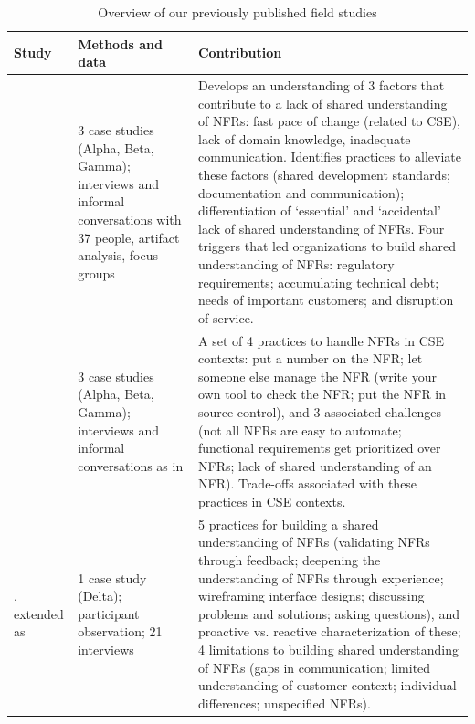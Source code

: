 \documentclass[smallextended]{svjour3}        %
\providecommand{\DIFdelbeginFL}{} %
\newcommand{\DIFscaledelfig}{0.5}
\newlength{\DIFdelgraphicswidth} %
\newlength{\DIFdelgraphicsheight} %
\newcommand{\DIFdelincludegraphics}[2][]{%
\sbox{\DIFdelgraphicsbox}{\DIFOincludegraphics[#1]{#2}}%
\settoboxwidth{\DIFdelgraphicswidth}{\DIFdelgraphicsbox} %
\settoboxtotalheight{\DIFdelgraphicsheight}{\DIFdelgraphicsbox} %
\scalebox{\DIFscaledelfig}{%
\parbox[b]{\DIFdelgraphicswidth}{\usebox{\DIFdelgraphicsbox}\\[-\baselineskip] \rule{\DIFdelgraphicswidth}{0em}}\llap{\resizebox{\DIFdelgraphicswidth}{\DIFdelgraphicsheight}{%
\setlength{\unitlength}{\DIFdelgraphicswidth}%
\begin{picture}(1,1)%
\thicklines\linethickness{2pt} %
{\color[rgb]{1,0,0}\put(0,0){\framebox(1,1){}}}%
{\color[rgb]{1,0,0}\put(0,0){\line( 1,1){1}}}%
{\color[rgb]{1,0,0}\put(0,1){\line(1,-1){1}}}%
\end{picture}%
}\hspace*{3pt}}} %
} %
\DeclareRobustCommand{\DIFdelbeginFL}{\DIFOdelbeginFL \let\includegraphics\DIFdelincludegraphics} %
\begin{document}
\begin{table}[!t]
    \caption{Overview of our previously published field studies}
    \label{tab:previous}
    \centering
    \DIFdelbeginFL %
\begin{tabular}{P{1.9cm}p{3cm}p{6.4cm}}
    \toprule 
    Study & Methods and data & Contribution  \\
    \midrule 
    \cite{werner2020re} & 3 case studies (Alpha, Beta, Gamma); interviews and informal conversations with 37 people, artifact analysis, focus groups & Develops an understanding of 3 factors that contribute to a lack of shared understanding of NFRs: fast pace of change (related to CSE), lack of domain knowledge, inadequate communication. Identifies practices to alleviate these factors (shared development standards; documentation and communication); differentiation of `essential' and `accidental' lack of shared understanding of NFRs. Four triggers that led organizations to build shared understanding of NFRs: regulatory requirements; accumulating technical debt; needs of important customers; and disruption of service.  \\
    \addlinespace
    \cite{werner_tse_2021} & 3 case studies (Alpha, Beta, Gamma); interviews and informal conversations as in \cite{werner2020re} & A set of 4 practices to handle NFRs in CSE contexts: put a number on the NFR; let someone else manage the NFR (write your own tool to check the NFR; put the NFR in source control), and 3 associated challenges (not all NFRs are easy to automate; functional requirements get prioritized over NFRs; lack of shared understanding of an NFR). Trade-offs associated with these practices in CSE contexts. \\
    \addlinespace
    \cite{okpara_re2022}, extended as \cite{okpara_rej2023} & 1 case study (Delta); participant observation; 21 interviews & 5 practices for building a shared understanding of NFRs (validating NFRs through feedback; deepening the understanding of NFRs through experience; wireframing interface designs; discussing problems and solutions; asking questions), and proactive vs. reactive characterization of these; 4 limitations to building shared understanding of NFRs (gaps in communication; limited understanding of customer context; individual differences; unspecified NFRs). \\    

    \bottomrule 
    \end{tabular}

\end{table}
\end{document}
